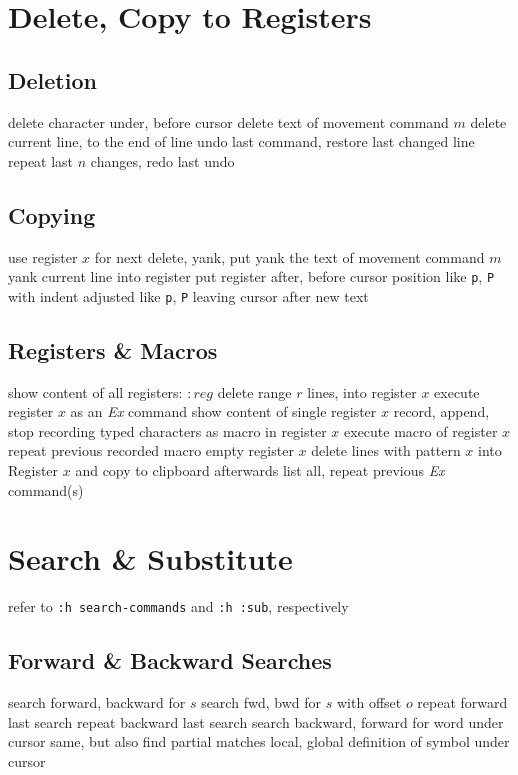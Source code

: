 \section{Delete, Copy to Registers}	{}
\subsection{Deletion}	{}
	{delete character under, before cursor}
	{delete text of movement command $m$}
	{delete current line, to the end of line}
	{undo last command, restore last changed line}
	{repeat last $n$ changes, redo last undo}

\subsection{Copying}	{}
	{use register $x$ for next delete, yank, put}
	{yank the text of movement command $m$}
	{yank current line into register}
	{put register after, before cursor position}
	{like {\tt p}, {\tt P} with indent adjusted}
	{like {\tt p}, {\tt P} leaving cursor after new text}

\subsection{Registers \& Macros}{show content of all registers: $:reg$ }
	{delete range $r$ lines, into register $x$}
	{execute register $x$ as an {\it Ex\/} command}
	{show content of single register $x$}
	{record, append, stop recording typed characters as macro in register $x$}
	{execute macro of register $x$}
	{repeat previous recorded macro}
	{empty register $x$}
	{delete lines with pattern $x$ into Register $x$ and copy to clipboard afterwards}
	{list all, repeat previous {\it Ex\/} command(s)}

\section{Search \& Substitute}	{refer to {\tt :h search-commands} and {\tt :h :sub}, respectively}
\subsection{Forward \& Backward Searches}	{}
	{search forward, backward for $s$}
	{search fwd, bwd for $s$ with offset $o$}
	{repeat forward last search}
	{repeat backward last search}
\cmdS{\# * }	{search backward, forward for word under cursor}
	{same, but also find partial matches}
	{local, global definition of symbol under cursor}

